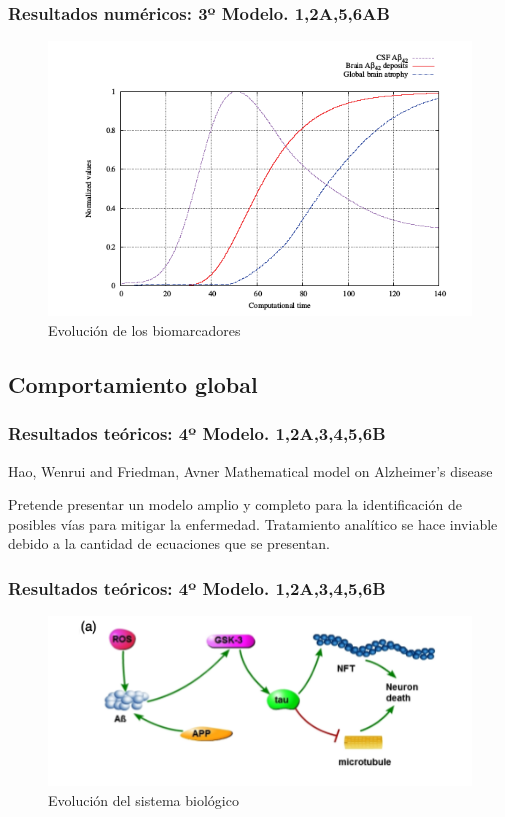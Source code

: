 \documentclass{beamer}
\begin{document}
\begin{frame}
	\frametitle{Resultados numéricos: 3º Modelo. 1,2A,5,6AB}
	
	\begin{figure}[Atrofia cerebral]
		\includegraphics[scale=0.4]{tercer3.png}
		\caption{Evolución de los biomarcadores}
		\label{cerebro4}
	\end{figure}
	
	
\end{frame}



\subsection{Comportamiento global}
\begin{frame}
	\frametitle{Resultados teóricos: 4º Modelo. 1,2A,3,4,5,6B}
	\begin{block}{Hao, Wenrui and Friedman, Avner}
		Mathematical model on Alzheimer’s disease
	\end{block}
	Pretende presentar un modelo amplio y completo para la identificación de posibles vías para mitigar la enfermedad. Tratamiento analítico se hace inviable debido a la cantidad de ecuaciones que se presentan.
\end{frame}

\begin{frame}
	\frametitle{Resultados teóricos: 4º Modelo. 1,2A,3,4,5,6B}
	
	\begin{figure}[Atrofia cerebral]
		\includegraphics[scale=0.6]{primerdiagrama.png}
		\caption{Evolución del sistema biológico}
		\label{cerebro4}
	\end{figure}
	
\end{frame}
\end{document}
